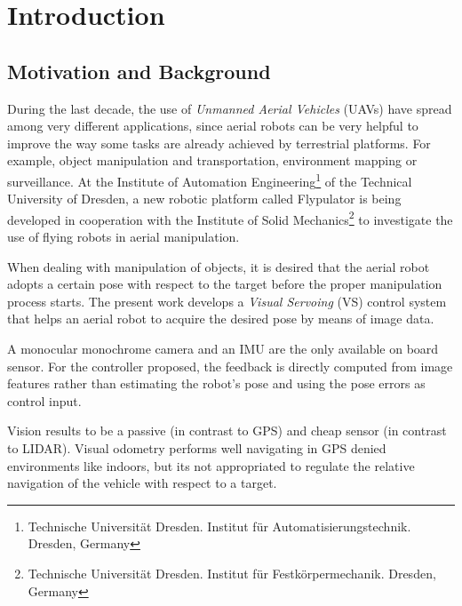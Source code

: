 
\chapter{Introduction}
\label{chap:introduction}

\section{Motivation and Background}
\label{sec:motivation-brackground}

During the last decade, the use of \emph{Unmanned Aerial Vehicles} (UAVs) have spread among very different applications, since aerial robots can be very helpful to improve the way some tasks are already achieved by terrestrial platforms. For example, object manipulation and transportation, environment mapping or surveillance. At the Institute of Automation Engineering\footnote{Technische Universität Dresden. Institut für Automatisierungstechnik. Dresden, Germany} of the Technical University of Dresden, a new robotic platform called Flypulator is being developed in cooperation with the Institute of Solid Mechanics\footnote{Technische Universität Dresden. Institut für Festkörpermechanik. Dresden, Germany} to investigate the use of flying robots in aerial manipulation.


When dealing with manipulation of objects, it is desired that the aerial robot adopts a certain pose with respect to the target before the proper manipulation process starts. The present work develops a \emph{Visual Servoing} (VS) control system that helps an aerial robot to acquire the desired pose by means of image data.


A monocular monochrome camera and an IMU are the only available on board sensor. For the controller proposed, the feedback is directly computed from image features rather than estimating the robot's pose and using the pose errors as control input.


Vision results to be a passive (in contrast to GPS) and cheap sensor (in contrast to LIDAR). Visual odometry performs well navigating in GPS denied environments like indoors, but its not appropriated to regulate the relative navigation of the vehicle with respect to a target.  

